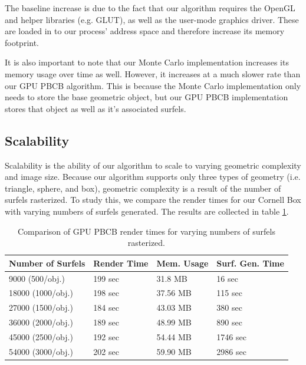 The baseline increase is due to the fact that our algorithm requires the OpenGL and helper libraries (e.g. GLUT), as well as the user-mode graphics driver. These are loaded in to our process’ address space and therefore increase its memory footprint.

It is also important to note that our Monte Carlo implementation increases its memory usage over time as well. However, it increases at a much slower rate than our GPU PBCB algorithm. This is because the Monte Carlo implementation only needs to store the base geometric object, but our GPU PBCB implementation stores that object as well as it’s associated surfels.

\subsection{Scalability}
Scalability is the ability of our algorithm to scale to varying geometric complexity and image size. Because our algorithm supports only three types of geometry (i.e. triangle, sphere, and box), geometric complexity is a result of the number of surfels rasterized. To study this, we compare the render times for our Cornell Box with varying numbers of surfels generated. The results are collected in table \ref{tbl:geometry_scale}.

\begin{table}[h!]
   \centering
   \begin{tabular}{ | l | l | l | l | }
   \hline
   \textbf{Number of Surfels} & \textbf{Render Time} & \textbf{Mem. Usage} & \textbf{Surf. Gen. Time}\\ \hline
   9000 (500/obj.) & 199 sec & 31.8 MB & 16 sec \\ \hline
   18000 (1000/obj.) & 198 sec & 37.56 MB & 115 sec \\ \hline
   27000 (1500/obj.) & 184 sec & 43.03 MB & 380 sec \\ \hline
   36000 (2000/obj.) & 189 sec & 48.99 MB & 890 sec \\ \hline
   45000 (2500/obj.) & 192 sec & 54.44 MB & 1746 sec \\ \hline
   54000 (3000/obj.) & 202 sec & 59.90 MB & 2986 sec \\ \hline
   \end{tabular}
   \captionfonts
   \caption[Scalability: Geometric Complexity]{Comparison of GPU PBCB render times for varying numbers of surfels rasterized.}
   \label{tbl:geometry_scale}
\end{table}

